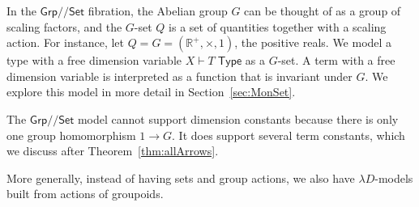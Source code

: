 \documentclass[a4paper,UKenglish]{lipics}
\theoremstyle{plain}
\newcommand{\msf}[1]{\mathsf{#1}} %
\newcommand{\Grp}{\msf{Grp}}
\newcommand{\Set}{\msf{Set}}
\newcommand{\Lslice}[1]{#1/\!/\Set}
\newcommand{\GrpSet}{\Lslice{\Grp}}
\newcommand{\Tj}[2]{#1 \vdash #2 \; \msf{ Type}}
\newcommand{\Dvar}{X}
\begin{document}
\begin{example}
In the $\GrpSet$ fibration, the Abelian group $G$ can be thought of as a group of scaling factors, and the $G$-set $Q$ is a set of quantities together with a scaling action. For instance, let $Q=G=(\mathbb R^+,\times,1)$, the positive reals. We model a type with a free dimension variable $\Tj\Dvar T$ as a $G$-set. A term with a free dimension variable is interpreted as a function that is invariant under $G$. We explore this model in more detail in Section~\ref{sec:MonSet}.

The $\GrpSet$ model cannot support dimension constants because there is only one group homomorphism $1\to G$.
It does support several term constants, which we discuss after Theorem~\ref{thm:allArrows}. \end{example}

More generally, instead of having sets and group actions, we also have $\lambda D$-models built from actions of groupoids.
\end{document}
